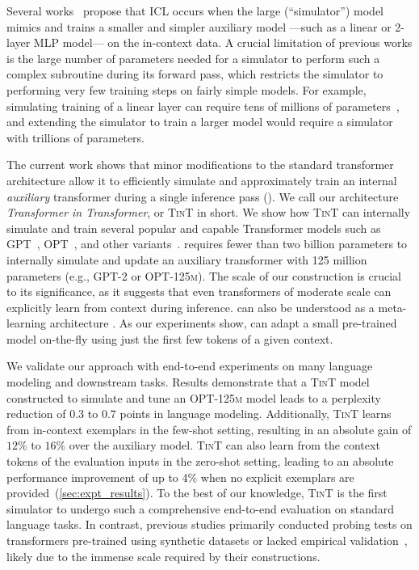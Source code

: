 Several works~\citep{akyurek2022learning,dai2022gpt,vonoswald2022transformers} propose that ICL occurs when the large (``simulator'') model mimics and trains a smaller and simpler auxiliary model ---such as a linear or 2-layer MLP model--- on the in-context data. 
A crucial limitation of previous works is the large number of parameters needed for a simulator to perform such a complex subroutine during its forward pass, which restricts the simulator to performing very few training steps on fairly simple models. 
For example, simulating training of a linear layer can require tens of millions of parameters~\citep{akyurek2022learning}, and extending the simulator to train a larger model would require a simulator with trillions of parameters.

The current work shows that minor modifications to the standard transformer architecture allow it to efficiently simulate and approximately train an internal \emph{auxiliary} transformer during a single inference pass ().
We call our architecture {\em Transformer in Transformer}, or \textsc{TinT} in short.
We show how \textsc{TinT} can internally simulate and train several popular and capable Transformer models such as GPT~\citep{radford2019language}, OPT~\citep{zhang2022opt}, and other variants~\citep{touvron2023llama, scao2022bloom}. 
\simulator{} requires fewer than two billion parameters to internally simulate and update an auxiliary transformer with 125 million parameters (e.g., \textsc{GPT-2} or \textsc{OPT-125m}). 
The scale of our construction is crucial to its significance, as it suggests that even transformers of moderate scale can explicitly learn from context during inference. \simulator{} can also be understood as a meta-learning architecture \citep{finn2017model,kirsch2022general}. As our experiments show, \simulator{} can adapt a small pre-trained model on-the-fly using just the first few tokens of a given context.

We validate our approach with end-to-end experiments on many language modeling and downstream tasks. Results demonstrate that a \textsc{TinT} model constructed to simulate and tune an \textsc{OPT-125m} model leads to a perplexity reduction of $0.3$ to $0.7$ points in language modeling. Additionally, \textsc{TinT} learns from in-context exemplars in the few-shot setting, resulting in an absolute gain of $12\%$ to $16\%$ over the auxiliary model.
\textsc{TinT} can also learn from the context tokens of the evaluation inputs in the zero-shot setting, leading to an absolute performance improvement of up to $4\%$ when no explicit exemplars are provided~(\cref{sec:expt_results}).  To the best of our knowledge, \textsc{TinT} is the first simulator to undergo such a comprehensive end-to-end evaluation on standard language tasks. In contrast, previous studies primarily conducted probing tests on transformers pre-trained using synthetic datasets or lacked empirical validation~\citep{akyurek2022learning, vonoswald2022transformers, giannou2023looped}, likely due to the immense scale required by their constructions.

